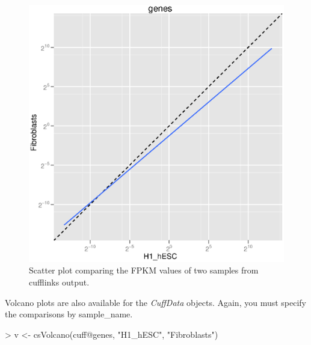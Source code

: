 \documentclass[10pt]{article}
\newcommand{\Rclass}[1]{{\textit{#1}}}
\begin{document}
\begin{figure}[ht]
\begin{center}
\includegraphics{cummeRbund-manual-global_plots_scatter}

\end{center}
\caption{Scatter plot comparing the FPKM values of two samples from cufflinks output.}
\end{figure}

Volcano plots are also available for the \Rclass{CuffData} objects. Again, you must specify the comparisons by sample_name.
\begin{Schunk}
\begin{Sinput}
> v <- csVolcano(cuff@genes, "H1_hESC", "Fibroblasts")
\end{Sinput}
\end{Schunk}
\end{document}
